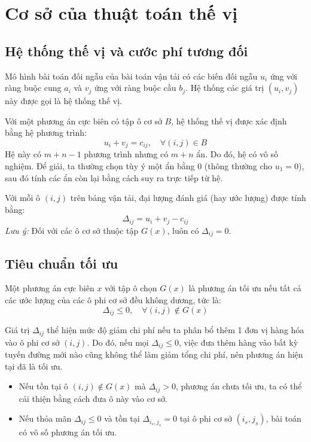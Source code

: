 \documentclass[../main.tex]{subfiles}
\begin{document}
\section{Cơ sở của thuật toán thế vị}

\subsection{Hệ thống thế vị và cước phí tương đối}
Mô hình bài toán đối ngẫu của bài toán vận tải có các biến đối ngẫu $u_i$ ứng với ràng buộc cung $a_i$ và $v_j$ ứng với ràng buộc cầu $b_j$. Hệ thống các giá trị $(u_i, v_j)$ này được gọi là hệ thống thế vị.

Với một phương án cực biên có tập ô cơ sở $B$, hệ thống thế vị được xác định bằng hệ phương trình:
\begin{equation}
    u_i + v_j = c_{ij}, \quad \forall (i, j) \in B
\end{equation}
Hệ này có $m+n-1$ phương trình nhưng có $m+n$ ẩn. Do đó, hệ có vô số nghiệm. Để giải, ta thường chọn tùy ý một ẩn bằng 0 (thông thường cho $u_1 = 0$), sau đó tính các ẩn còn lại bằng cách suy ra trực tiếp từ hệ.

\begin{definition}
    Với mỗi ô $(i,j)$ trên bảng vận tải, đại lượng đánh giá (hay ước lượng) được tính bằng:
    \begin{equation}
        \Delta_{ij} = u_i + v_j - c_{ij}
    \end{equation}
    \textit{Lưu ý:} Đối với các ô cơ sở thuộc tập $G(x)$, luôn có $\Delta_{ij} = 0$.
\end{definition}

\subsection{Tiêu chuẩn tối ưu}
    
\begin{theorem} \label{thm:optimality}
    Một phương án cực biên $x$ với tập ô chọn $G(x)$ là phương án tối ưu nếu tất cả các ước lượng của các ô phi cơ sở đều không dương, tức là:
    \begin{equation}
        \Delta_{ij} \le 0, \quad \forall (i,j) \notin G(x)
    \end{equation}
\end{theorem}
Giá trị $\Delta_{ij}$ thể hiện mức độ giảm chi phí nếu ta phân bổ thêm 1 đơn vị hàng hóa vào ô phi cơ sở $(i,j)$. Do đó, nếu mọi $\Delta_{ij} \le 0$, việc đưa thêm hàng vào bất kỳ tuyến đường mới nào cũng không thể làm giảm tổng chi phí, nên phương án hiện tại đã là tối ưu. 
\begin{itemize}
    \item Nếu tồn tại ô $(i,j) \notin G(x)$ mà $\Delta_{ij} > 0$, phương án chưa tối ưu, ta có thể cải thiện bằng cách đưa ô này vào cơ sở.
    \item Nếu thỏa mãn $\Delta_{ij} \le 0$ và tồn tại $\Delta_{i_s, j_s} = 0$ tại ô phi cơ sở $(i_s, j_s)$, bài toán có vô số phương án tối ưu.
\end{itemize}
\end{document}
